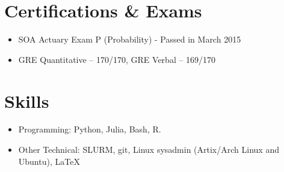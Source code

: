 \documentclass[10pt,a4paper]{moderncv}        %
\makeatletter
\newcommand*{\customcvproject}[4][.25em]{
  \begin{tabular}{@{}l}
    {\bfseries #2}
  \end{tabular}
  \hfill%
  \begin{tabular}{l@{}}
     {\itshape #3}
  \end{tabular}
  \ifx&#4&%
  \else{\\%
    \begin{minipage}{\maincolumnwidth}%
      \small#4%
    \end{minipage}}\fi%
  \par\addvspace{#1}}
\makeatother
\begin{document}
\ifx
\section{Certifications \& Exams}
\begin{minipage}{\maincolumnwidth}%
	\small{
    	\begin{itemize}
          \item[\textbullet] SOA Actuary Exam P (Probability) - Passed in March 2015
          \item[\textbullet] GRE Quantitative -- 170/170, GRE Verbal -- 169/170
		\end{itemize}}%
\end{minipage}%
\fi

\section{Skills}
\begin{minipage}{\maincolumnwidth}%
	\small{
    	\begin{itemize}
          \item[\textbullet] Programming: Python, Julia, Bash, R.
          \item[\textbullet] Other Technical: SLURM, git, Linux sysadmin (Artix/Arch Linux and Ubuntu), \LaTeX
		\end{itemize}}%
\end{minipage}%


%
\end{document}
